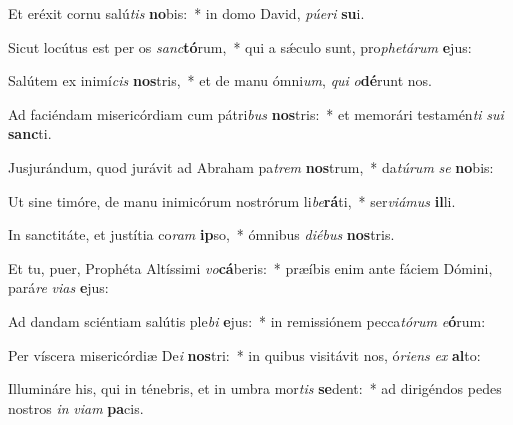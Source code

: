 \item Et eréxit cornu salú\textit{tis} \textbf{no}bis:~* in domo David, \textit{pú}\textit{e}\textit{ri} \textbf{su}i.
\item Sicut locútus est per os \textit{sanc}\textbf{tó}rum,~* qui a sǽculo sunt, pro\textit{phe}\textit{tá}\textit{rum} \textbf{e}jus:
\item Salútem ex inimí\textit{cis} \textbf{nos}tris,~* et de manu ómni\textit{um}, \textit{qui} \textit{o}\textbf{dé}runt nos.
\item Ad faciéndam misericórdiam cum pátri\textit{bus} \textbf{nos}tris:~* et memorári testamén\textit{ti} \textit{su}\textit{i} \textbf{sanc}ti.
\item Jusjurándum, quod jurávit ad Abraham pa\textit{trem} \textbf{nos}trum,~* da\textit{tú}\textit{rum} \textit{se} \textbf{no}bis:
\item Ut sine timóre, de manu inimicórum nostrórum li\textit{be}\textbf{rá}ti,~* ser\textit{vi}\textit{á}\textit{mus} \textbf{il}li.
\item In sanctitáte, et justítia co\textit{ram} \textbf{ip}so,~* ómnibus \textit{di}\textit{é}\textit{bus} \textbf{nos}tris.
\item Et tu, puer, Prophéta Altíssimi \textit{vo}\textbf{cá}beris:~* præíbis enim ante fáciem Dómini, pará\textit{re} \textit{vi}\textit{as} \textbf{e}jus:
\item Ad dandam sciéntiam salútis ple\textit{bi} \textbf{e}jus:~* in remissiónem pecca\textit{tó}\textit{rum} \textit{e}\textbf{ó}rum:
\item Per víscera misericórdiæ De\textit{i} \textbf{nos}tri:~* in quibus visitávit nos, ó\textit{ri}\textit{ens} \textit{ex} \textbf{al}to:
\item Illumináre his, qui in ténebris, et in umbra mor\textit{tis} \textbf{se}dent:~* ad dirigéndos pedes nostros \textit{in} \textit{vi}\textit{am} \textbf{pa}cis.
